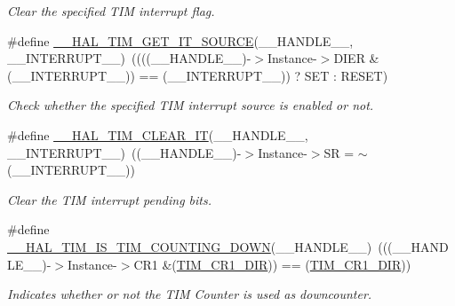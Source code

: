 \begin{DoxyCompactItemize}
\begin{DoxyCompactList}\small\item\em Clear the specified T\+IM interrupt flag. \end{DoxyCompactList}\item 
\#define \mbox{\hyperlink{group___t_i_m___exported___macros_ga644babf93470a6eee6bce8906c4da5c5}{\+\_\+\+\_\+\+H\+A\+L\+\_\+\+T\+I\+M\+\_\+\+G\+E\+T\+\_\+\+I\+T\+\_\+\+S\+O\+U\+R\+CE}}(\+\_\+\+\_\+\+H\+A\+N\+D\+L\+E\+\_\+\+\_\+,  \+\_\+\+\_\+\+I\+N\+T\+E\+R\+R\+U\+P\+T\+\_\+\+\_\+)~((((\+\_\+\+\_\+\+H\+A\+N\+D\+L\+E\+\_\+\+\_\+)-\/$>$Instance-\/$>$D\+I\+ER \& (\+\_\+\+\_\+\+I\+N\+T\+E\+R\+R\+U\+P\+T\+\_\+\+\_\+)) == (\+\_\+\+\_\+\+I\+N\+T\+E\+R\+R\+U\+P\+T\+\_\+\+\_\+)) ? S\+ET \+: R\+E\+S\+ET)
\begin{DoxyCompactList}\small\item\em Check whether the specified T\+IM interrupt source is enabled or not. \end{DoxyCompactList}\item 
\#define \mbox{\hyperlink{group___t_i_m___exported___macros_gaea68155ce77e591e0c2582def061d6f0}{\+\_\+\+\_\+\+H\+A\+L\+\_\+\+T\+I\+M\+\_\+\+C\+L\+E\+A\+R\+\_\+\+IT}}(\+\_\+\+\_\+\+H\+A\+N\+D\+L\+E\+\_\+\+\_\+,  \+\_\+\+\_\+\+I\+N\+T\+E\+R\+R\+U\+P\+T\+\_\+\+\_\+)~((\+\_\+\+\_\+\+H\+A\+N\+D\+L\+E\+\_\+\+\_\+)-\/$>$Instance-\/$>$SR = $\sim$(\+\_\+\+\_\+\+I\+N\+T\+E\+R\+R\+U\+P\+T\+\_\+\+\_\+))
\begin{DoxyCompactList}\small\item\em Clear the T\+IM interrupt pending bits. \end{DoxyCompactList}\item 
\#define \mbox{\hyperlink{group___t_i_m___exported___macros_gac73f5e7669d92971830481e7298e98ba}{\+\_\+\+\_\+\+H\+A\+L\+\_\+\+T\+I\+M\+\_\+\+I\+S\+\_\+\+T\+I\+M\+\_\+\+C\+O\+U\+N\+T\+I\+N\+G\+\_\+\+D\+O\+WN}}(\+\_\+\+\_\+\+H\+A\+N\+D\+L\+E\+\_\+\+\_\+)~(((\+\_\+\+\_\+\+H\+A\+N\+D\+L\+E\+\_\+\+\_\+)-\/$>$Instance-\/$>$C\+R1 \&(\mbox{\hyperlink{group___peripheral___registers___bits___definition_gacea10770904af189f3aaeb97b45722aa}{T\+I\+M\+\_\+\+C\+R1\+\_\+\+D\+IR}})) == (\mbox{\hyperlink{group___peripheral___registers___bits___definition_gacea10770904af189f3aaeb97b45722aa}{T\+I\+M\+\_\+\+C\+R1\+\_\+\+D\+IR}}))
\begin{DoxyCompactList}\small\item\em Indicates whether or not the T\+IM Counter is used as downcounter. \end{DoxyCompactList}\item 

\end{DoxyCompactItemize}
